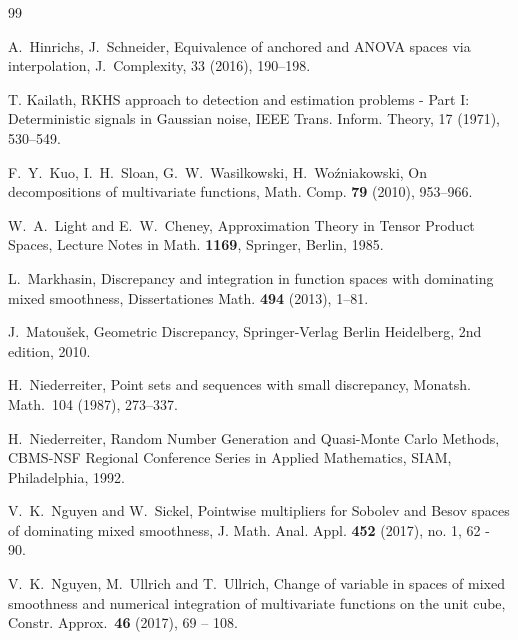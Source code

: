 \documentclass[12pt]{article}
\begin{document}
{\begin{thebibliography}{99}

A.~Hinrichs, J.~Schneider, Equivalence of anchored and ANOVA spaces via interpolation, J.~Complexity, 33 (2016), 190--198.

 T. Kailath, RKHS approach to detection and estimation
problems - Part I: Deterministic signals in {G}aussian noise, IEEE
Trans. Inform. Theory, 17 (1971), 530--549.

%

  F.~Y.~Kuo, I.~H.~Sloan, G.~W.~Wasilkowski, H.~Wo\'zniakowski,
  On decompositions of multivariate functions, Math. Comp. {\bf 79}
  (2010), 953--966.

{W.~A.~Light and E.~W.~Cheney}, {Approximation Theory in Tensor Product Spaces}, Lecture
Notes in Math. {\bf 1169}, Springer, Berlin, 1985.
  
   
L.~Markhasin, Discrepancy and integration in function spaces with dominating mixed smoothness,
  Dissertationes Math. {\bf 494} (2013), 1--81.
  
 J.~Matou\v{s}ek, Geometric Discrepancy, Springer-Verlag Berlin Heidelberg, 2nd edition, 2010. 

 H.~Niederreiter, Point sets and sequences with small discrepancy, Monatsh. Math.~104 (1987), 273--337.

 H.~Niederreiter, Random Number Generation and Quasi-Monte Carlo Methods, CBMS-NSF Regional Conference Series in Applied Mathematics, SIAM, Philadelphia, 1992.

V.~K.~Nguyen  and W.~Sickel,  Pointwise multipliers for Sobolev and Besov spaces of dominating mixed smoothness, J. Math. Anal. Appl. 
{\bf 452} (2017), no. 1, 62 - 90. 

V.~K.~Nguyen, M.~Ullrich  and T.~Ullrich,  Change of variable in spaces of mixed smoothness and numerical integration of multivariate functions on the unit cube, Constr. Approx.~{\bf 46} (2017), 
69 -- 108. 


\end{thebibliography}}
\end{document}
